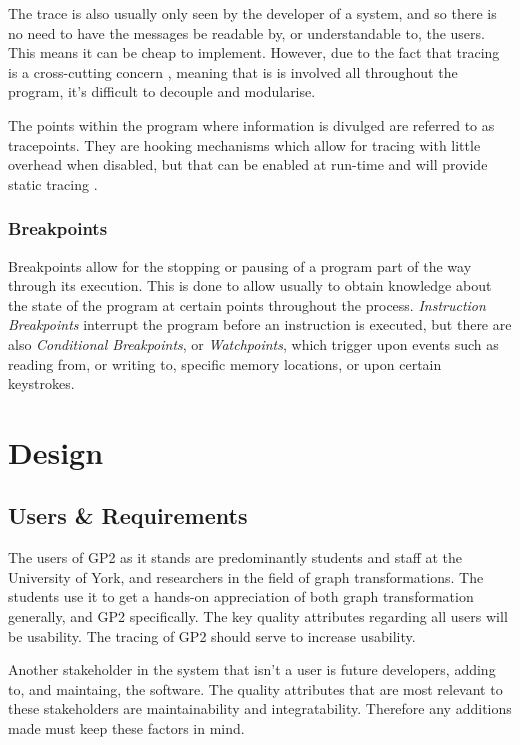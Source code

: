 \documentclass{UoYCSproject}
\begin{document}
The trace is also usually only seen by the developer of a system, and so there is no need to have the messages be readable by, or understandable to, the users. This means it can be cheap to implement. However, due to the fact that tracing is a cross-cutting concern \cite{wiki_tracing}, meaning that is is involved all throughout the program, it's difficult to decouple and modularise.

The points within the program where information is divulged are referred to as tracepoints. They are hooking mechanisms which allow for tracing with little overhead when disabled, but that can be enabled at run-time and will provide static tracing \cite{tracing_book}.

\subsection{Breakpoints}
Breakpoints allow for the stopping or pausing of a program part of the way through its execution. This is done to allow usually to obtain knowledge about the state of the program at certain points throughout the process. \emph{Instruction Breakpoints} interrupt the program before an instruction is executed, but there are also \emph{Conditional Breakpoints}, or \emph{Watchpoints}, which trigger upon events such as reading from, or writing to, specific memory locations, or upon certain keystrokes.

\chapter{Design}
\section{Users \& Requirements}

The users of GP2 as it stands are predominantly students and staff at the University of York, and researchers in the field of graph transformations. The students use it to get a hands-on appreciation of both graph transformation generally, and GP2 specifically. The key quality attributes regarding all users will be usability. The tracing of GP2 should serve to increase usability. 

Another stakeholder in the system that isn't a user is future developers, adding to, and maintaing, the software. The quality attributes that are most relevant to these stakeholders are maintainability and integratability. Therefore any additions made must keep these factors in mind.
\end{document}
